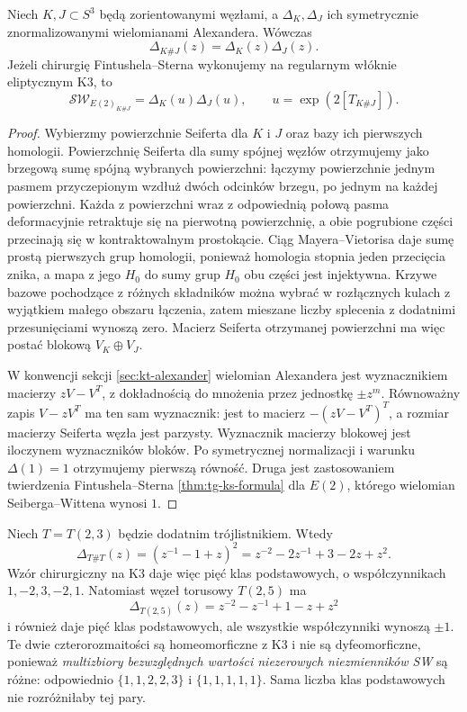 \begin{stwierdzenie}
\label{prop:tg-ks-connected-sum}
Niech $K,J\subset S^3$ będą zorientowanymi
węzłami, a $\Delta_K,\Delta_J$ ich
symetrycznie znormalizowanymi
wielomianami Alexandera.
Wówczas
\[
\Delta_{K\#J}(z)=\Delta_K(z)\Delta_J(z).
\]
Jeżeli chirurgię Fintushela--Sterna wykonujemy
na regularnym włóknie eliptycznym K3, to
\[
\mathcal{SW}_{E(2)_{K\#J}}
=\Delta_K(u)\Delta_J(u),
\qquad u=\exp(2[T_{K\#J}]).
\]
\end{stwierdzenie}

\begin{proof}
Wybierzmy powierzchnie Seiferta dla $K$ i $J$
oraz bazy ich pierwszych homologii.
Powierzchnię Seiferta dla sumy spójnej węzłów
otrzymujemy jako brzegową sumę spójną wybranych
powierzchni:
łączymy powierzchnie jednym pasmem przyczepionym
wzdłuż dwóch odcinków brzegu, po jednym na każdej
powierzchni. Każda z powierzchni wraz z odpowiednią
połową pasma deformacyjnie retraktuje się na
pierwotną powierzchnię, a obie pogrubione części
przecinają się w kontraktowalnym prostokącie.
Ciąg Mayera--Vietorisa daje sumę prostą pierwszych
grup homologii, ponieważ homologia stopnia jeden
przecięcia znika, a mapa z jego $H_0$ do sumy
grup $H_0$ obu części jest injektywna. Krzywe bazowe
pochodzące z różnych składników można
wybrać w rozłącznych kulach z wyjątkiem
małego obszaru łączenia, zatem
mieszane liczby splecenia z dodatnimi
przesunięciami wynoszą zero.
Macierz Seiferta otrzymanej powierzchni
ma więc postać blokową $V_K\oplus V_J$.

W konwencji sekcji \ref{sec:kt-alexander}
wielomian Alexandera jest wyznacznikiem
macierzy $zV-V^T$, z dokładnością do
mnożenia przez jednostkę $\pm z^m$.
Równoważny zapis $V-zV^T$ ma ten sam wyznacznik:
jest to macierz $-(zV-V^T)^T$, a rozmiar
macierzy Seiferta węzła jest parzysty.
Wyznacznik macierzy blokowej
jest iloczynem wyznaczników bloków.
Po symetrycznej normalizacji
i warunku $\Delta(1)=1$
otrzymujemy pierwszą równość.
Druga jest zastosowaniem twierdzenia
Fintushela--Sterna
\ref{thm:tg-ks-formula} dla $E(2)$,
którego wielomian Seiberga--Wittena
wynosi $1$.
\end{proof}

\begin{przyklad}
\label{ex:tg-ks-connected-trefoils}
Niech $T=T(2,3)$ będzie dodatnim trójlistnikiem.
Wtedy
\[
\Delta_{T\#T}(z)
=(z^{-1}-1+z)^2
=z^{-2}-2z^{-1}+3-2z+z^2.
\]
Wzór chirurgiczny na K3 daje więc
pięć klas podstawowych, o
współczynnikach $1,-2,3,-2,1$.
Natomiast węzeł torusowy $T(2,5)$ ma
\[
\Delta_{T(2,5)}(z)
=z^{-2}-z^{-1}+1-z+z^2
\]
i również daje pięć klas podstawowych,
ale wszystkie współczynniki wynoszą $\pm1$.
Te dwie czterorozmaitości są
homeomorficzne z K3 i nie są
dyfeomorficzne, ponieważ
\emph{multizbiory bezwzględnych wartości
niezerowych niezmienników SW} są różne:
odpowiednio $\{1,1,2,2,3\}$
i $\{1,1,1,1,1\}$.
Sama liczba klas podstawowych nie
rozróżniłaby tej pary.
\end{przyklad}

